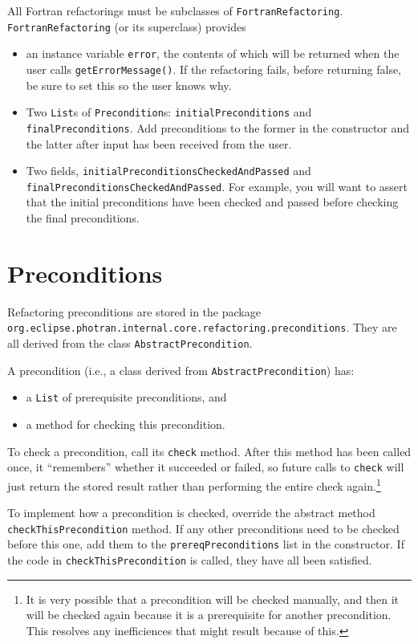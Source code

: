 All Fortran refactorings must be subclasses of \texttt{FortranRefactoring}.
\texttt{FortranRefactoring} (or its superclass) provides
\begin{itemize}
\item an instance variable \texttt{error}, the contents of which will be
      returned
      when the user calls \texttt{getErrorMessage()}.  If the refactoring fails,
      before returning false, be sure to set this so the user knows why.
\item Two \texttt{List}s of \texttt{Precondition}s:
      \texttt{initialPreconditions}
      and \texttt{finalPreconditions}.  Add preconditions to the former in the
      constructor and the latter after input has been received from the user.
\item Two fields, \texttt{initialPreconditionsCheckedAndPassed} and
      \texttt{finalPreconditionsCheckedAndPassed}.  For example, you will want
      to assert that the initial preconditions have been checked and passed
      before checking the final preconditions.
\end{itemize}

\section{Preconditions}

Refactoring preconditions are stored in the package
\texttt{org.eclipse.photran.internal.core.refactoring.preconditions}.
They are all derived from the class \texttt{AbstractPrecondition}.

A precondition (i.e., a class derived from \texttt{AbstractPrecondition})
has:
\begin{itemize}
\item a \texttt{List} of prerequisite preconditions, and
\item a method for checking this precondition.
\end{itemize}

To check a precondition, call its \texttt{check} method.  After this method
has been called once, it ``remembers'' whether it succeeded or failed, so
future calls to \texttt{check} will just return the stored result rather than
performing the entire check again.\footnote{It is very possible that a
precondition will be checked manually, and then it will be checked again
because it is a prerequisite for another precondition.  This resolves any
inefficiences that might result because of this.}

To implement how a precondition is checked, override the abstract method
\texttt{checkThisPrecondition} method.  If any other preconditions need
to be checked before this one, add them to the \texttt{prereqPreconditions}
list in the constructor.  If the code in \texttt{checkThisPrecondition} is
called, they have all been satisfied.

